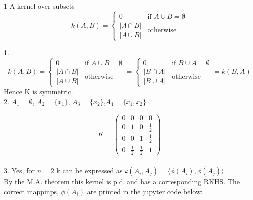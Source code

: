 \documentclass[18pt]{article}
\begin{document}
\begin{flushleft}

1 A kernel over subsets
\[
k(A,B)=\begin{cases}
    0 & \text{if } A\cup B =\emptyset \\
    \dfrac{|A \cap B|}{|A\cup B|} & \text{otherwise}
\end{cases}
\]

1. \[ k(A,B)=\begin{cases}
    0 & \text{if } A\cup B =\emptyset \\
    \dfrac{|A \cap B|}{|A\cup B|} & \text{otherwise}
\end{cases}
=\begin{cases}
    0 & \text{if } B\cup A =\emptyset \\
    \dfrac{|B \cap A|}{|B\cup A|} & \text{otherwise}
\end{cases}
=k(B,A)
\]
Hence K is symmetric.\\
\vspace{.4cm}
2. $A_1=\emptyset$, $A_2=\{x_1\}$, $A_3=\{x_2\}$,$A_4=\{x_1,x_2\}$\\
\vspace{.4cm}

\[ K=
\begin{pmatrix}
    0 & 0 & 0 & 0\\
    0 & 1 & 0 & \frac{1}{2}\\
    0 & 0 & 1 & \frac{1}{2}\\
    0 & \frac{1}{2} & \frac{1}{2} & 1
 \end{pmatrix}
\]\\
\vspace{.4cm}
3. Yes, for $n=2$ k can be expressed as $k(A_i,A_j)=\langle \phi(A_i),\phi(A_j)\rangle$.\\
\vspace{.4cm}
By the M.A. theorem this kernel is p.d. and has a corresponding RKHS. The correct mappinps,
$\phi(A_i)$ are printed in the jupyter code below:\\

\end{flushleft}
\end{document}
